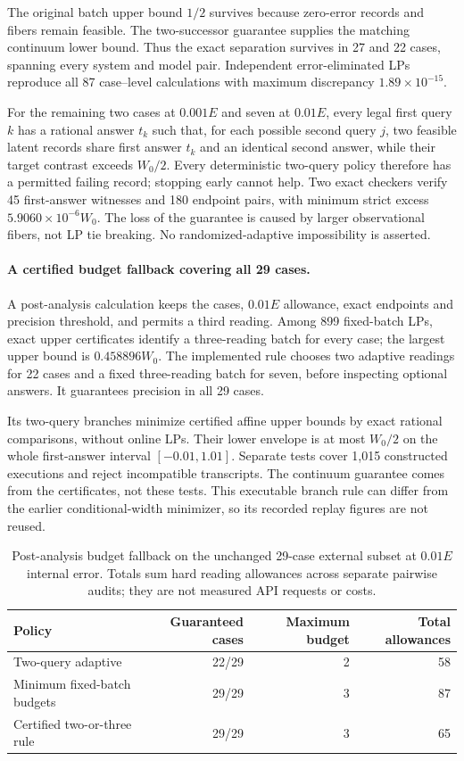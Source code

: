 \documentclass[12pt]{article}
\begin{document}
The original batch upper bound $1/2$ survives because zero-error records
and fibers remain feasible. The two-successor guarantee supplies the
matching continuum lower bound. Thus the exact separation survives in
27 and 22 cases, spanning every system and model pair. Independent
error-eliminated LPs reproduce all 87 case--level calculations with maximum
discrepancy $1.89\times10^{-15}$.

For the remaining two cases at $0.001E$ and seven at $0.01E$, every legal first query $k$ has a
rational answer $t_k$ such that, for each possible second query $j$, two
feasible latent records share first answer $t_k$ and an identical second
answer, while their target contrast exceeds $W_0/2$. Every deterministic
two-query policy therefore has a permitted failing record; stopping early
cannot help. Two exact checkers verify 45 first-answer witnesses and 180
endpoint pairs, with minimum strict excess $5.9060\times10^{-6}W_0$.
The loss of the guarantee is caused by larger observational fibers, not
LP tie breaking. No randomized-adaptive impossibility is asserted.

\paragraph{A certified budget fallback covering all 29 cases.}
A post-analysis calculation keeps the cases, $0.01E$ allowance, exact
endpoints and precision threshold, and permits a third reading. Among
899 fixed-batch LPs, exact upper certificates identify a three-reading
batch for every case; the largest upper bound is $0.458896W_0$.
The implemented rule chooses two adaptive readings for 22 cases and a
fixed three-reading batch for seven, before inspecting optional answers.
It guarantees precision in all 29 cases.

Its two-query branches minimize certified affine upper bounds by exact
rational comparisons, without online LPs. Their lower envelope is at most
$W_0/2$ on the whole first-answer interval $[-0.01,1.01]$.
Separate tests cover 1,015 constructed executions and reject incompatible
transcripts. The continuum guarantee comes from the certificates, not
these tests. This executable branch rule can differ from the earlier
conditional-width minimizer, so its recorded replay figures are not reused.

\begin{table}[htbp]\centering\small
\caption{Post-analysis budget fallback on the unchanged 29-case external
subset at $0.01E$ internal error. Totals sum hard reading allowances across
separate pairwise audits; they are not measured API requests or costs.}
\label{tab:stored-error-fallback}
\begin{tabular}{lrrr}\toprule
Policy & Guaranteed cases & Maximum budget & Total allowances\\\midrule
Two-query adaptive & 22/29 & 2 & 58\\
Minimum fixed-batch budgets & 29/29 & 3 & 87\\
Certified two-or-three rule & 29/29 & 3 & 65\\\bottomrule
\end{tabular}\end{table}
\end{document}
